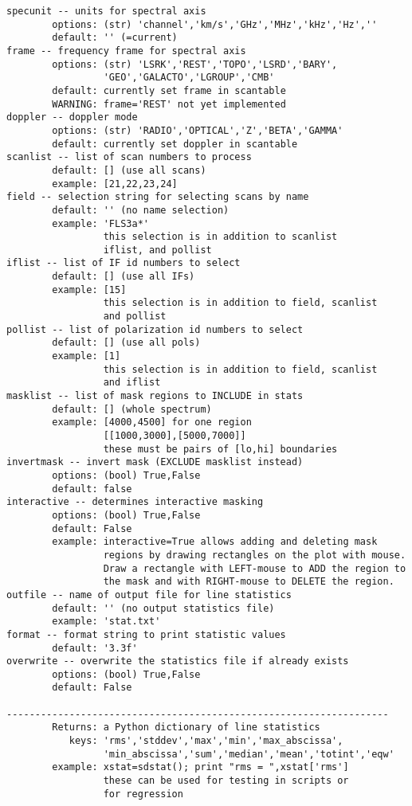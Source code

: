 \begin{verbatim}
specunit -- units for spectral axis
        options: (str) 'channel','km/s','GHz','MHz','kHz','Hz',''
        default: '' (=current)
frame -- frequency frame for spectral axis
        options: (str) 'LSRK','REST','TOPO','LSRD','BARY',
                 'GEO','GALACTO','LGROUP','CMB'
        default: currently set frame in scantable
        WARNING: frame='REST' not yet implemented
doppler -- doppler mode
        options: (str) 'RADIO','OPTICAL','Z','BETA','GAMMA'
        default: currently set doppler in scantable
scanlist -- list of scan numbers to process
        default: [] (use all scans)
        example: [21,22,23,24]
field -- selection string for selecting scans by name
        default: '' (no name selection)
        example: 'FLS3a*'
                 this selection is in addition to scanlist
                 iflist, and pollist
iflist -- list of IF id numbers to select
        default: [] (use all IFs)
        example: [15]
                 this selection is in addition to field, scanlist
                 and pollist
pollist -- list of polarization id numbers to select
        default: [] (use all pols)
        example: [1]
                 this selection is in addition to field, scanlist
                 and iflist
masklist -- list of mask regions to INCLUDE in stats
        default: [] (whole spectrum)
        example: [4000,4500] for one region
                 [[1000,3000],[5000,7000]]
                 these must be pairs of [lo,hi] boundaries
invertmask -- invert mask (EXCLUDE masklist instead)
        options: (bool) True,False
        default: false
interactive -- determines interactive masking
        options: (bool) True,False
        default: False
        example: interactive=True allows adding and deleting mask 
                 regions by drawing rectangles on the plot with mouse. 
                 Draw a rectangle with LEFT-mouse to ADD the region to 
                 the mask and with RIGHT-mouse to DELETE the region. 
outfile -- name of output file for line statistics
        default: '' (no output statistics file)
        example: 'stat.txt'
format -- format string to print statistic values
        default: '3.3f'
overwrite -- overwrite the statistics file if already exists 
        options: (bool) True,False
        default: False

-------------------------------------------------------------------
        Returns: a Python dictionary of line statistics
           keys: 'rms','stddev','max','min','max_abscissa',
                 'min_abscissa','sum','median','mean','totint','eqw'
        example: xstat=sdstat(); print "rms = ",xstat['rms']
                 these can be used for testing in scripts or
                 for regression


\end{verbatim}
